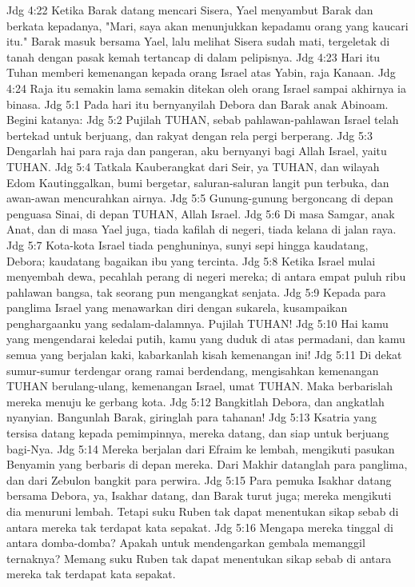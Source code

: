 Jdg 4:22  Ketika Barak datang mencari Sisera, Yael menyambut Barak dan berkata kepadanya, "Mari, saya akan menunjukkan kepadamu orang yang kaucari itu." Barak masuk bersama Yael, lalu melihat Sisera sudah mati, tergeletak di tanah dengan pasak kemah tertancap di dalam pelipisnya.
Jdg 4:23  Hari itu Tuhan memberi kemenangan kepada orang Israel atas Yabin, raja Kanaan.
Jdg 4:24  Raja itu semakin lama semakin ditekan oleh orang Israel sampai akhirnya ia binasa.
Jdg 5:1  Pada hari itu bernyanyilah Debora dan Barak anak Abinoam. Begini katanya:
Jdg 5:2  Pujilah TUHAN, sebab pahlawan-pahlawan Israel telah bertekad untuk berjuang, dan rakyat dengan rela pergi berperang.
Jdg 5:3  Dengarlah hai para raja dan pangeran, aku bernyanyi bagi Allah Israel, yaitu TUHAN.
Jdg 5:4  Tatkala Kauberangkat dari Seir, ya TUHAN, dan wilayah Edom Kautinggalkan, bumi bergetar, saluran-saluran langit pun terbuka, dan awan-awan mencurahkan airnya.
Jdg 5:5  Gunung-gunung bergoncang di depan penguasa Sinai, di depan TUHAN, Allah Israel.
Jdg 5:6  Di masa Samgar, anak Anat, dan di masa Yael juga, tiada kafilah di negeri, tiada kelana di jalan raya.
Jdg 5:7  Kota-kota Israel tiada penghuninya, sunyi sepi hingga kaudatang, Debora; kaudatang bagaikan ibu yang tercinta.
Jdg 5:8  Ketika Israel mulai menyembah dewa, pecahlah perang di negeri mereka; di antara empat puluh ribu pahlawan bangsa, tak seorang pun mengangkat senjata.
Jdg 5:9  Kepada para panglima Israel yang menawarkan diri dengan sukarela, kusampaikan penghargaanku yang sedalam-dalamnya. Pujilah TUHAN!
Jdg 5:10  Hai kamu yang mengendarai keledai putih, kamu yang duduk di atas permadani, dan kamu semua yang berjalan kaki, kabarkanlah kisah kemenangan ini!
Jdg 5:11  Di dekat sumur-sumur terdengar orang ramai berdendang, mengisahkan kemenangan TUHAN berulang-ulang, kemenangan Israel, umat TUHAN. Maka berbarislah mereka menuju ke gerbang kota.
Jdg 5:12  Bangkitlah Debora, dan angkatlah nyanyian. Bangunlah Barak, giringlah para tahanan!
Jdg 5:13  Ksatria yang tersisa datang kepada pemimpinnya, mereka datang, dan siap untuk berjuang bagi-Nya.
Jdg 5:14  Mereka berjalan dari Efraim ke lembah, mengikuti pasukan Benyamin yang berbaris di depan mereka. Dari Makhir datanglah para panglima, dan dari Zebulon bangkit para perwira.
Jdg 5:15  Para pemuka Isakhar datang bersama Debora, ya, Isakhar datang, dan Barak turut juga; mereka mengikuti dia menuruni lembah. Tetapi suku Ruben tak dapat menentukan sikap sebab di antara mereka tak terdapat kata sepakat.
Jdg 5:16  Mengapa mereka tinggal di antara domba-domba? Apakah untuk mendengarkan gembala memanggil ternaknya? Memang suku Ruben tak dapat menentukan sikap sebab di antara mereka tak terdapat kata sepakat.
